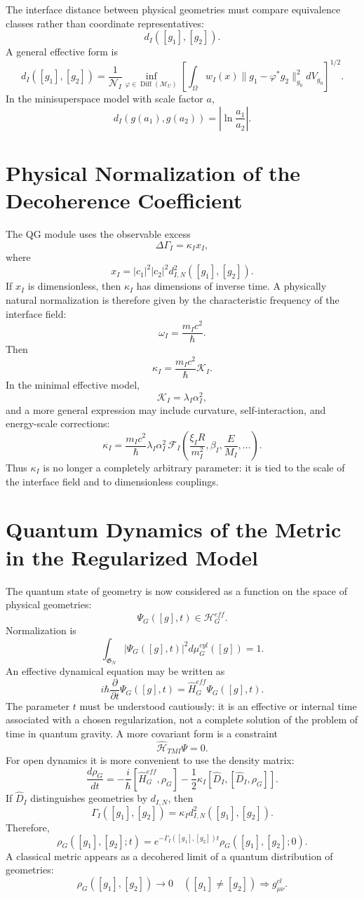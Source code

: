 \documentclass[12pt,a4paper]{article}
\DeclareMathOperator{\Diff}{Diff}
\newcommand{\M}{\mathcal M_U}
\newcommand{\Hilb}{\mathcal H}
\newcommand{\gfrak}{\mathfrak G}
\begin{document}
The interface distance between physical geometries must compare equivalence classes rather than coordinate representatives:
\[
\boxed{d_I([g_1],[g_2]).}
\]
A general effective form is
\[
\boxed{
d_I([g_1],[g_2])=\frac1{\mathcal N_I}\inf_{\varphi\in\Diff(\M)}
\left[\int_\Omega w_I(x)\|g_1-\varphi^*g_2\|_{g_0}^2dV_{g_0}\right]^{1/2}.
}
\]
In the minisuperspace model with scale factor $a$,
\[
\boxed{d_I(g(a_1),g(a_2))=\left|\ln\frac{a_1}{a_2}\right|.}
\]

\section{Physical Normalization of the Decoherence Coefficient}
The QG module uses the observable excess
\[
\boxed{\Delta\Gamma_I=\kappa_I x_I,}
\]
where
\[
\boxed{x_I=|c_1|^2|c_2|^2d_{I,N}^2([g_1],[g_2]).}
\]
If $x_I$ is dimensionless, then $\kappa_I$ has dimensions of inverse time. A physically natural normalization is therefore given by the characteristic frequency of the interface field:
\[
\boxed{\omega_I=\frac{m_Ic^2}{\hbar}.}
\]
Then
\[
\boxed{\kappa_I=\frac{m_Ic^2}{\hbar}\mathcal K_I.}
\]
In the minimal effective model,
\[
\boxed{\mathcal K_I=\lambda_I\alpha_I^2,}
\]
and a more general expression may include curvature, self-interaction, and energy-scale corrections:
\[
\boxed{
\kappa_I=\frac{m_Ic^2}{\hbar}\lambda_I\alpha_I^2\,
\mathcal F_I\left(\frac{\xi_I R}{m_I^2},\beta_I,\frac{E}{M_I},\ldots\right).
}
\]
Thus $\kappa_I$ is no longer a completely arbitrary parameter: it is tied to the scale of the interface field and to dimensionless couplings.

\section{Quantum Dynamics of the Metric in the Regularized Model}
The quantum state of geometry is now considered as a function on the space of physical geometries:
\[
\boxed{\Psi_G([g],t)\in\Hilb_G^{eff}.}
\]
Normalization is
\[
\boxed{\int_{\gfrak_N}|\Psi_G([g],t)|^2d\mu_G^{cyl}([g])=1.}
\]
An effective dynamical equation may be written as
\[
\boxed{i\hbar\frac{\partial}{\partial t}\Psi_G([g],t)=\widehat H_G^{eff}\Psi_G([g],t).}
\]
The parameter $t$ must be understood cautiously: it is an effective or internal time associated with a chosen regularization, not a complete solution of the problem of time in quantum gravity. A more covariant form is a constraint
\[
\boxed{\widehat{\mathcal H}_{TMI}\Psi=0.}
\]
For open dynamics it is more convenient to use the density matrix:
\[
\boxed{
\frac{d\rho_G}{dt}=-\frac{i}{\hbar}[\widehat H_G^{eff},\rho_G]
-\frac12\kappa_I[\widehat D_I,[\widehat D_I,\rho_G]].
}
\]
If $\widehat D_I$ distinguishes geometries by $d_{I,N}$, then
\[
\boxed{\Gamma_I([g_1],[g_2])=\kappa_I d_{I,N}^2([g_1],[g_2]).}
\]
Therefore,
\[
\boxed{\rho_G([g_1],[g_2];t)=e^{-\Gamma_I([g_1],[g_2])t}\rho_G([g_1],[g_2];0).}
\]
A classical metric appears as a decohered limit of a quantum distribution of geometries:
\[
\boxed{\rho_G([g_1],[g_2])\to0\quad([g_1]\ne[g_2])\Rightarrow g_{\mu\nu}^{cl}.}
\]
\end{document}
